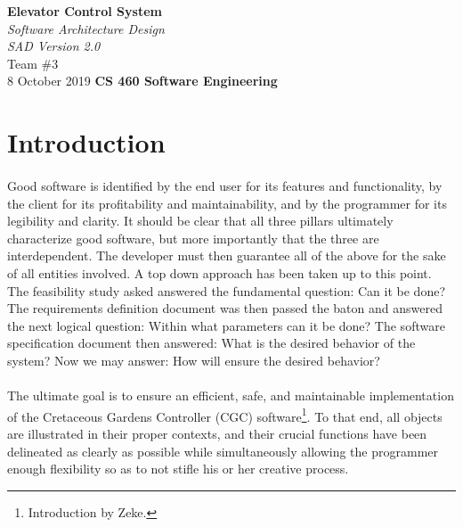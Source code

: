 \documentclass[12pt]{article}
\begin{document}
\begin{titlepage}
    \begin{flushleft}
        \vspace{1cm} \Huge  \textbf{Elevator Control System}\\
        \vspace{1cm} \Huge  \textit{Software Architecture Design}\\
        \vspace{1cm} \Large \textit{SAD Version 2.0}\\
        \vspace{5cm} \LARGE         Team \#3\\ 
                                    8 October 2019
        \vfill       \Huge  \textbf{CS 460 Software Engineering}
    \end{flushleft}
\end{titlepage}
\normalsize 
\tableofcontents
\pagebreak

\section{Introduction} \label{intro}
\paragraph{} Good software is identified by the end user for its features and functionality, by the client
for its profitability and maintainability, and by the programmer for its legibility and clarity. It should be clear
that all three pillars ultimately characterize good software, but more importantly that the three are interdependent.
The developer must then guarantee all of the above for the sake of all entities involved. A top down approach has been
taken up to this point. The feasibility study asked answered the fundamental question: Can it be done? The requirements
definition document was then passed the baton and answered the next logical question: Within what parameters can it be done?
The software specification document then answered: What is the desired behavior of the system? Now we may answer: 
How will ensure the desired behavior?

\paragraph{} The ultimate goal is to ensure an efficient, safe, and maintainable implementation of the Cretaceous Gardens Controller (CGC) software\footnote{Introduction by Zeke.}. To that end, all objects are illustrated in their proper contexts, and their crucial functions have been delineated as clearly as possible while simultaneously allowing the programmer enough flexibility so as to not stifle his or her creative process. 
\end{document}
